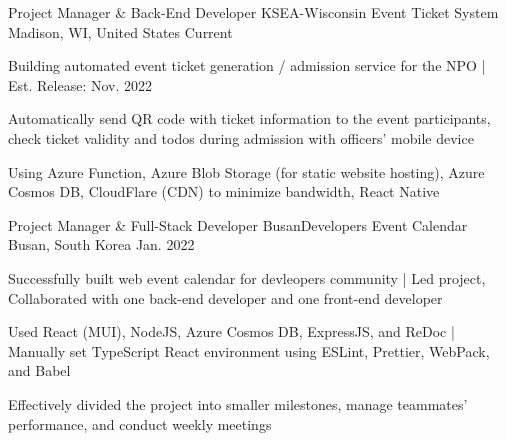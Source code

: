 

\begin{cventries}

  \cventry
  {Project Manager \& Back-End Developer} %
  {KSEA-Wisconsin Event Ticket System} %
  {Madison, WI, United States} %
  {Current} %
  {
    \begin{cvitems} %
      \item {Building automated event ticket generation / admission service for the NPO | Est. Release: Nov. 2022}
      \item {Automatically send QR code with ticket information to the event participants, check ticket validity and todos during admission with officers' mobile device}
      \item {Using Azure Function, Azure Blob Storage (for static website hosting), Azure Cosmos DB, CloudFlare (CDN) to minimize bandwidth, React Native}
    \end{cvitems}
  }

  \cventry
  {Project Manager \& Full-Stack Developer} %
  {BusanDevelopers Event Calendar} %
  {Busan, South Korea} %
  {Jan. 2022} %
  {
    \begin{cvitems} %
      \item {Successfully built web event calendar for devleopers community | Led project, Collaborated with one back-end developer and one front-end developer}
      \item {Used React (MUI), NodeJS, Azure Cosmos DB, ExpressJS, and ReDoc | Manually set TypeScript React environment using ESLint, Prettier, WebPack, and Babel}
      \item {Effectively divided the project into smaller milestones, manage teammates' performance, and conduct weekly meetings}
    \end{cvitems}
  }


\end{cventries}
